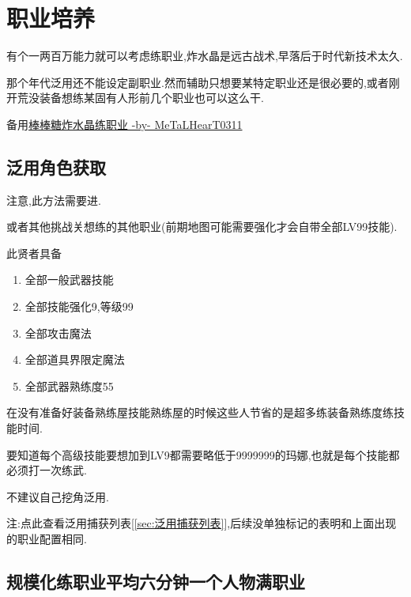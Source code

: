 \newpage


	\section{职业培养}

	有个一两百万能力就可以考虑练职业,炸水晶是远古战术,早落后于时代新技术太久.

	那个年代泛用还不能设定副职业.然而辅助只想要某特定职业还是很必要的,或者刚开荒没装备想练某固有人形前几个职业也可以这么干.

	备用\href{http://tieba.baidu.com/p/3717431968}{棒棒糖炸水晶练职业 -by- MeTaLHearT0311}

		\subsection{泛用角色获取}

		注意,此方法需要进{\color{red}{修罗以后}}.

		{\color{red}{去兔兔魔界挑战关,抓捕贤者}}或者其他挑战关想练的其他职业(前期地图可能需要强化才会自带全部LV99技能).

		此贤者具备
		\begin{enumerate}
			\item 全部一般武器技能
			\item 全部技能强化9,等级99
			\item 全部攻击魔法
			\item 全部道具界限定魔法
			\item 全部武器熟练度55
		\end{enumerate}
		
		在没有准备好装备熟练屋技能熟练屋的时候这些人节省的是超多练装备熟练度练技能时间.

		要知道每个高级技能要想加到LV9都需要略低于9999999的玛娜,也就是每个技能都必须打一次练武.

		不建议自己挖角泛用.

		注:点此查看泛用捕获列表[\ref{sec:泛用捕获列表}],后续没单独标记的表明和上面出现的职业配置相同.

	\newpage

		\subsection{规模化练职业平均六分钟一个人物满职业}

